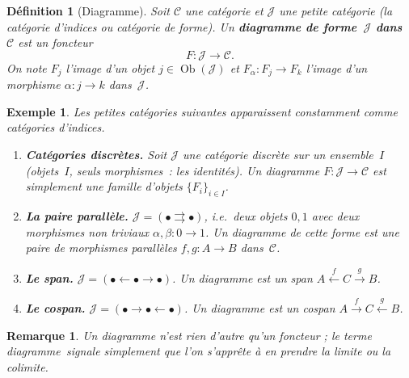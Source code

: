 \documentclass[a4paper,12pt]{book}
\DeclareMathOperator{\Ob}{Ob}
\newtheorem{definition}[theoreme]{Définition}
\newtheorem{exemple}[theoreme]{Exemple}
\newtheorem*{remarque}{Remarque}
\providecommand{\og}{\guillemotleft\,}
\providecommand{\fg}{\,\guillemotright}
\begin{document}
\begin{definition}[Diagramme]\label{def:diagramme}
Soit $\mathcal{C}$ une catégorie et $\mathcal{J}$ une petite catégorie
(la \emph{catégorie d'indices} ou \emph{catégorie de forme}).
Un \textbf{diagramme de forme~$\mathcal{J}$ dans~$\mathcal{C}$} est un foncteur
\[
    F \colon \mathcal{J} \longrightarrow \mathcal{C}.
\]
On note $F_j$ l'image d'un objet $j \in \Ob(\mathcal{J})$
et $F_\alpha \colon F_j \to F_k$ l'image d'un morphisme
$\alpha \colon j \to k$ dans~$\mathcal{J}$.
\end{definition}

\begin{exemple}\label{ex:formes-diagrammes}
Les petites catégories suivantes apparaissent constamment comme catégories d'indices.
\begin{enumerate}[label=(\roman*)]
\item \textbf{Catégories discrètes.}
    Soit $\mathcal{J}$ une catégorie discrète sur un ensemble~$I$
    (objets~$I$, seuls morphismes~: les identités).
    Un diagramme $F\colon \mathcal{J}\to\mathcal{C}$ est simplement une famille
    d'objets $\{F_i\}_{i\in I}$.

\item \textbf{La paire parallèle.}
    $\mathcal{J} = (\bullet \rightrightarrows \bullet)$,
    i.e.\ deux objets $0,1$ avec deux morphismes non triviaux
    $\alpha,\beta\colon 0\to 1$.
    Un diagramme de cette forme est une paire de morphismes parallèles
    $f,g\colon A\to B$ dans~$\mathcal{C}$.

\item \textbf{Le span.}
    $\mathcal{J} = (\bullet \leftarrow \bullet \rightarrow \bullet)$.
    Un diagramme est un span $A \xleftarrow{f} C \xrightarrow{g} B$.

\item \textbf{Le cospan.}
    $\mathcal{J} = (\bullet \rightarrow \bullet \leftarrow \bullet)$.
    Un diagramme est un cospan $A \xrightarrow{f} C \xleftarrow{g} B$.
\end{enumerate}
\end{exemple}

\begin{remarque}\label{rem:diagramme-notation}
Un diagramme n'est rien d'autre qu'un foncteur ; le terme
\og{}diagramme\fg{} signale simplement que l'on s'apprête à en
prendre la limite ou la colimite.
\end{remarque}
\end{document}

